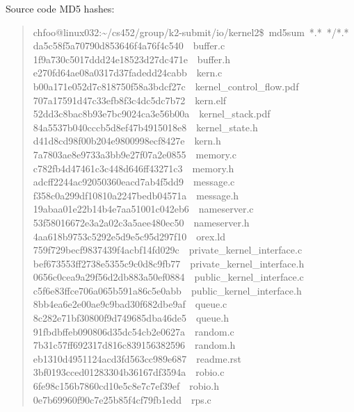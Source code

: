 \documentclass[letterpaper, 11pt]{article}
\begin{document}
Source code MD5 hashes:
%
\begin{quote}{\ttfamily \raggedright \noindent
chfoo@linux032:\textasciitilde{}/cs452/group/k2-submit/io/kernel2\$~md5sum~*.*~*/*.*\\
da5c58f5a70790d853646f4a76f4c540~~buffer.c\\
1f9a730c5017ddd24e18523d27dc471e~~buffer.h\\
e270fd64ae08a0317d37fadedd24cabb~~kern.c\\
b00a171e052d7c818750f58a3bdcf27c~~kernel\_control\_flow.pdf\\
707a17591d47c33efb8f3c4dc5dc7b72~~kern.elf\\
52dd3c8bac8b93e7bc9024ca3e56b00a~~kernel\_stack.pdf\\
84a5537b040cccb5d8ef47b4915018e8~~kernel\_state.h\\
d41d8cd98f00b204e9800998ecf8427e~~kern.h\\
7a7803ae8e9733a3bb9e27f07a2e0855~~memory.c\\
c782fb4d47461c3c448d646ff43271c3~~memory.h\\
adcff2244ac92050360eacd7ab4f5dd9~~message.c\\
f358c0a299df10810a2247bedb04571a~~message.h\\
19abaa01e22b14b4e7aa51001c042eb6~~nameserver.c\\
53f58016672e3a2a02c3a5aee480ec50~~nameserver.h\\
4aa618b9753c5292e5d9e5c95d297f10~~orex.ld\\
759f729becf9837439f4acbf14fd029c~~private\_kernel\_interface.c\\
bef673553ff2738e5355c9c0d8c9fb77~~private\_kernel\_interface.h\\
0656c0cea9a29f56d2db883a50ef0884~~public\_kernel\_interface.c\\
c5f6e83ffce706a065b591a86c5e0abb~~public\_kernel\_interface.h\\
8bb4ea6e2e00ae9c9bad30f682dbe9af~~queue.c\\
8c282e71bf30800f9d749685dba46de5~~queue.h\\
91fbdbffeb090806d35dc54cb2e0627a~~random.c\\
7b31c57ff692317d816c839156382596~~random.h\\
eb1310d4951124acd3fd563cc989e687~~readme.rst\\
3bf0193cced01283304b36167df3594a~~robio.c\\
6fe98c156b7860cd10e5c8e7c7ef39ef~~robio.h\\
0e7b69960f90c7e25b85f4cf79fb1edd~~rps.c\\
}
\end{quote}
\end{document}
